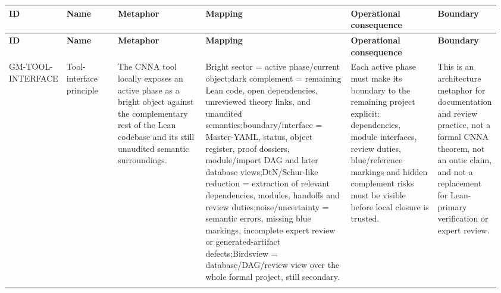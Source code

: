\footnotesize
{}
\begin{longtable}{L{0.055\linewidth} L{0.115\linewidth} L{0.195\linewidth} L{0.315\linewidth} L{0.19\linewidth} L{0.095\linewidth}}
\hline
\textbf{ID} & \textbf{Name} & \textbf{Metaphor} & \textbf{Mapping} & \textbf{Operational consequence} & \textbf{Boundary}\\
\hline
\endfirsthead
\hline
\textbf{ID} & \textbf{Name} & \textbf{Metaphor} & \textbf{Mapping} & \textbf{Operational consequence} & \textbf{Boundary}\\
\hline
\endhead
GM-TOOL-INTERFACE & Tool-interface principle & The CNNA tool locally exposes an active phase as a bright object against the complementary rest of the Lean codebase and its still unaudited semantic surroundings. & Bright sector = active phase/\allowbreak{}current object;\newline dark complement = remaining Lean code, open dependencies, unreviewed theory links, and unaudited semantics;\newline boundary/\allowbreak{}interface = Master-YAML, status, object register, proof dossiers, module/\allowbreak{}import DAG and later database views;\newline DtN/\allowbreak{}Schur-like reduction = extraction of relevant dependencies, modules, handoffs and review duties;\newline noise/\allowbreak{}uncertainty = semantic errors, missing blue markings, incomplete expert review or generated-artifact defects;\newline Birdsview = database/\allowbreak{}DAG/\allowbreak{}review view over the whole formal project, still secondary. & Each active phase must make its boundary to the remaining project explicit: dependencies, module interfaces, review duties, blue/\allowbreak{}reference markings and hidden complement risks must be visible before local closure is trusted. & This is an architecture metaphor for documentation and review practice, not a formal CNNA theorem, not an ontic claim, and not a replacement for Lean-primary verification or expert review.\\
\hline
\addlinespace[0.24em]
\end{longtable}
\normalsize
